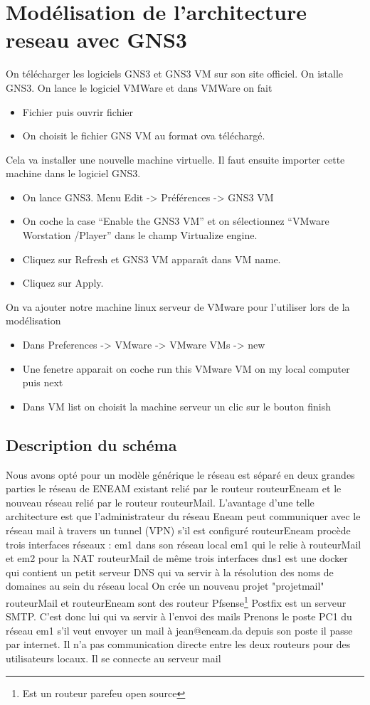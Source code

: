 \documentclass[a4paper,12pt,french]{report} %
\begin{document}
\section{Modélisation de l'architecture reseau avec GNS3}
	On télécharger les logiciels GNS3  et  GNS3 VM sur son site officiel. On istalle GNS3.
On lance le logiciel VMWare et dans VMWare on fait 
\begin{itemize}
	\item Fichier puis ouvrir fichier
	\item  On choisit le fichier GNS VM au format ova téléchargé.
\end{itemize}
Cela va installer une nouvelle machine virtuelle. Il faut ensuite importer cette machine dans le logiciel GNS3.
\begin{itemize}
	\item On lance GNS3. Menu Edit -> Préférences -> GNS3 VM
	\item On coche la case  “Enable the GNS3 VM” et on sélectionnez “VMware Worstation /Player” dans le champ Virtualize engine.
	\item Cliquez sur Refresh et GNS3 VM apparaît dans VM name.
	\item Cliquez sur Apply.
\end{itemize}
On va ajouter notre machine linux serveur de VMware pour l'utiliser lors de la modélisation
\begin{itemize}
	\item Dans Preferences -> VMware -> VMware VMs -> new
	\item Une fenetre apparait on coche run this VMware VM on my local computer puis next
	\item Dans VM list on choisit la machine serveur un clic sur le bouton finish
\end{itemize}
\subsection{Description du schéma}
Nous avons opté pour un modèle générique
le réseau est séparé en deux grandes parties le réseau de ENEAM existant relié par le routeur routeurEneam et le nouveau réseau relié par le routeur routeurMail.
L'avantage d'une telle architecture est que l'administrateur du réseau Eneam peut communiquer avec le réseau mail à travers un tunnel (VPN) s'il est configuré
routeurEneam procède trois interfaces réseaux : em1 dans son réseau local em1 qui le relie à routeurMail et em2 pour la NAT 
routeurMail de même trois interfaces 
dns1 est une docker qui contient un petit serveur DNS qui va servir à la résolution des noms de domaines au sein du réseau local 
On crée un nouveau projet "projetmail"
routeurMail et routeurEneam sont des routeur Pfsense\footnote{Est un routeur parefeu open source}
Postfix est un serveur SMTP. C'est donc lui qui va servir à l'envoi des mails
Prenons le poste PC1 du réseau em1 s'il veut envoyer un mail à  jean@eneam.da
depuis son poste il passe par internet. Il n'a pas communication directe entre les deux routeurs pour des  utilisateurs locaux.
Il se connecte au serveur mail
\end{document}
